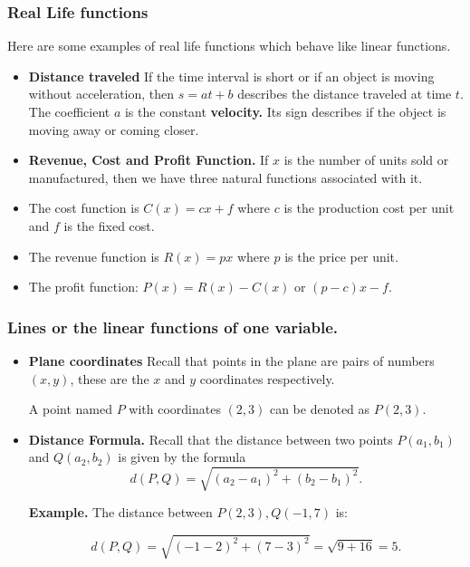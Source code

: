 \begin{frame}
  \frametitle{Real Life functions}
  Here are some examples of real life functions which behave like linear functions.
 \begin{itemize}%

\item {\bf Distance traveled}
If the time interval is short or if an object is moving without acceleration, then $s=at+b$ 
describes the distance traveled at time $t$. 
The coefficient $a$ is the constant {\bf velocity.} Its sign 
describes if the object is moving away or coming closer.
\item {\bf Revenue, Cost  and Profit Function.} If $x$ is the number of units sold or
manufactured, then  we have three natural functions associated with it.
\item The cost function is $C(x)=cx+f$ where $c$ is the production cost per unit 
 and $f$ is the fixed  cost.
\item The revenue function is $R(x) = px$ where $p$ is the  price per unit.
 \item
 The profit function:  $P(x)=R(x)-C(x)$ or $(p-c)x -f $.
\end{itemize}

\end{frame}

 

 
 
 

\begin{frame}
  \frametitle{Lines or the linear functions of one variable.}
 
 


  
    \begin{itemize}
    \item {\bf Plane coordinates}
    Recall that points in the plane are pairs of numbers $(x,y)$, these are the $x$ and $y$ 
    coordinates respectively.
    
    A point named $P$ with coordinates $(2,3)$ can be denoted as $P(2,3)$.
    
      
      
    \item {\bf Distance Formula.}
    Recall that the distance between two points $P(a_1,b_1)$ and $Q(a_2,b_2)$ is
    given by the formula
    $$d(P,Q) = \sqrt{(a_2-a_1)^2+ (b_2-b_1)^2}.$$
    
    {\bf Example.} The distance between $P(2,3), Q(-1,7)$ is:
    
    $$d(P,Q) = \sqrt{(-1-2)^2+(7-3)^2}=\sqrt{9+16}=5.$$
    
    \end{itemize}
    
      

\end{frame}

